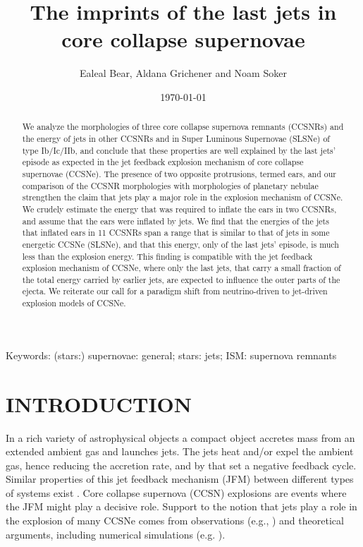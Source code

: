 \documentclass[12pt,preprint,a4paper]{aastex}
\date{\today}
\begin{document}
\title{The imprints of the last jets in core collapse supernovae}

\author{Ealeal Bear, Aldana Grichener and Noam Soker}




\begin{abstract}
We analyze the morphologies of three core collapse supernova remnants (CCSNRs) and the energy of jets in other CCSNRs and  in Super Luminous Supernovae (SLSNe) of type Ib/Ic/IIb, and conclude that these properties are well explained by the last jets' episode as expected in the jet feedback explosion mechanism of core collapse supernovae (CCSNe).
The presence of two opposite protrusions, termed ears, and our comparison of the CCSNR morphologies with morphologies of planetary nebulae strengthen the claim that jets play a major role in the explosion mechanism of CCSNe. 
We crudely estimate the energy that was required to inflate the ears in two CCSNRs, and assume that the ears were inflated by jets. We find that the energies of the jets that inflated ears in 11 CCSNRs span a range that is similar to that of jets in some energetic CCSNe (SLSNe), and that this energy, only of the last jets' episode, is much less than the explosion energy. This finding is compatible with the jet feedback explosion mechanism of CCSNe, where only the last jets, that carry a small fraction of the total energy carried by earlier jets, are expected to influence the outer parts of the ejecta. We reiterate our call for a paradigm shift from neutrino-driven to jet-driven explosion models of CCSNe.  
\end{abstract}

Keywords: (stars:) supernovae: general; stars: jets; ISM: supernova remnants

\section{INTRODUCTION}
\label{sec:intro}

In a rich variety of astrophysical objects a compact object accretes mass from an extended ambient gas and launches jets. The jets heat and/or expel the ambient gas, hence reducing the accretion rate, and by that set a negative feedback cycle. 
Similar properties of this jet feedback mechanism (JFM) between  different types of systems exist \citep{Soker2016Rev}. Core collapse supernova (CCSN) explosions are events where the JFM might play a decisive role.  
Support to the notion that jets play a role in the explosion of many CCSNe 
comes from observations (e.g., \citealt{Lopezetal2014, Gonzalezetal2014, Milisavljevicetal2015, Tanakaetal2017}) and  theoretical arguments, including numerical simulations (e.g. \citealt{BrombergTchekhovskoy2016, Gilkis2017, Nishimuraetal2017}). 
\end{document}

